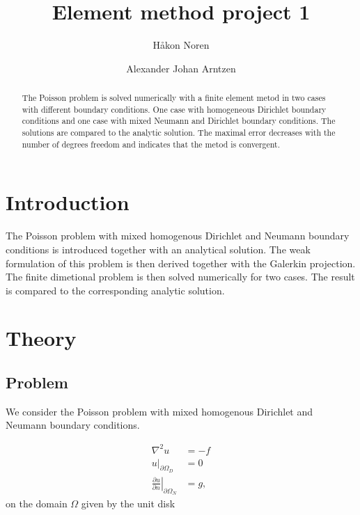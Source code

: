 \documentclass[11pt,a4paper,english]{elsarticle}%
\newcommand{\restr}[2]{\ensuremath{\left.#1\right|_{#2}}}
\begin{document}
\begin{frontmatter}

\title{Element method project 1}
\author[matematikk]{Håkon Noren}

\author[matematikk]{Alexander Johan Arntzen }

\address[matematikk]{Department of Mathematical Science, Norwegian University of Science and Technology, N-7491 Trondheim, Norway.}


\begin{abstract}
The Poisson problem is solved numerically with a finite element metod in two cases with different boundary conditions.
One case with homogeneous Dirichlet boundary conditions and one case with mixed Neumann and Dirichlet boundary conditions. 
The solutions are compared to the analytic solution. The maximal error decreases with the number of degrees freedom and indicates that the metod is convergent. 
\end{abstract}

\end{frontmatter}


\section{Introduction}
The Poisson problem with mixed homogenous Dirichlet and Neumann boundary conditions is introduced together with an analytical solution. 
The weak formulation of this problem is then derived together with the Galerkin projection. 
The finite dimetional problem is then solved numerically for two cases. The result is compared to the corresponding analytic solution. 

\section{Theory}

\subsection{Problem}

We consider the Poisson problem with mixed homogenous Dirichlet and Neumann boundary conditions. 

\begin{equation}
\begin{aligned}
    \nabla^2 u &= - f \\
    \restr{u}{\partial \Omega_{D}}  &= 0 \\
    \restr{\frac{\partial u}{\partial n}}{\partial \Omega_{N}} &= g,
\label{poission-problem}
\end{aligned}
\end{equation}
on the domain $\Omega$ given by the unit disk
\end{document}
